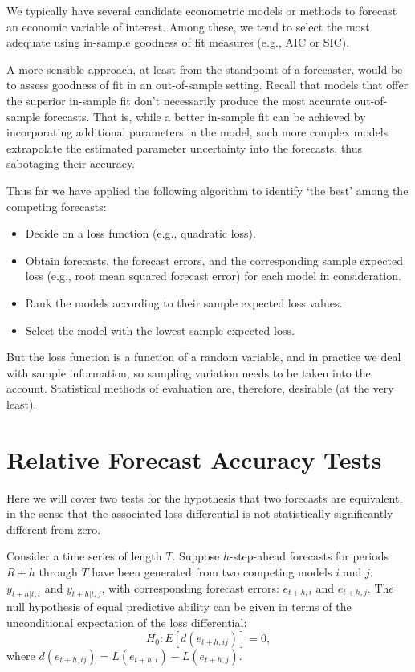 \documentclass[
  oneside]{book}
\providecommand{\tightlist}{%
  \setlength{\itemsep}{0pt}\setlength{\parskip}{0pt}}
\begin{document}
We typically have several candidate econometric models or methods to forecast an economic variable of interest. Among these, we tend to select the most adequate using in-sample goodness of fit measures (e.g., AIC or SIC).

A more sensible approach, at least from the standpoint of a forecaster, would be to assess goodness of fit in an out-of-sample setting. Recall that models that offer the superior in-sample fit don't necessarily produce the most accurate out-of-sample forecasts. That is, while a better in-sample fit can be achieved by incorporating additional parameters in the model, such more complex models extrapolate the estimated parameter uncertainty into the forecasts, thus sabotaging their accuracy.

Thus far we have applied the following algorithm to identify `the best' among the competing forecasts:

\begin{itemize}
\tightlist
\item
  Decide on a loss function (e.g., quadratic loss).
\item
  Obtain forecasts, the forecast errors, and the corresponding sample expected loss (e.g., root mean squared forecast error) for each model in consideration.
\item
  Rank the models according to their sample expected loss values.
\item
  Select the model with the lowest sample expected loss.
\end{itemize}

But the loss function is a function of a random variable, and in practice we deal with sample information, so sampling variation needs to be taken into the account. Statistical methods of evaluation are, therefore, desirable (at the very least).

\hypertarget{relative-forecast-accuracy-tests}{%
\section{Relative Forecast Accuracy Tests}\label{relative-forecast-accuracy-tests}}

Here we will cover two tests for the hypothesis that two forecasts are equivalent, in the sense that the associated loss differential is not statistically significantly different from zero.

Consider a time series of length \(T\). Suppose \(h\)-step-ahead forecasts for periods \(R+h\) through \(T\) have been generated from two competing models \(i\) and \(j\): \(y_{t+h|t,i}\) and \(y_{t+h|t,j}\), with corresponding forecast errors: \(e_{t+h,i}\) and \(e_{t+h,j}\). The null hypothesis of equal predictive ability can be given in terms of the unconditional expectation of the loss differential: \[H_0: E\left[d(e_{t+h,ij})\right] = 0,\] where \(d(e_{t+h,ij}) = L(e_{t+h,i})-L(e_{t+h,j})\).
\end{document}
